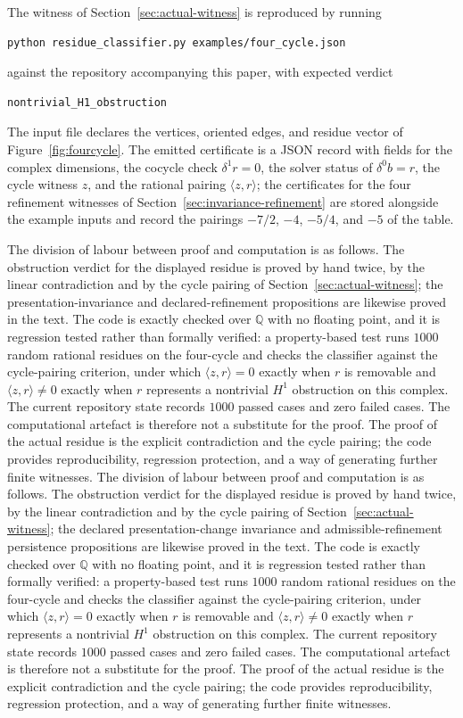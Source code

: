 \documentclass[11pt]{article}
\newcommand{\Q}{\mathbb{Q}}
\begin{document}
The witness of Section~\ref{sec:actual-witness} is reproduced by running
\begin{verbatim}
python residue_classifier.py examples/four_cycle.json
\end{verbatim}
against the repository accompanying this paper, with expected verdict
\begin{verbatim}
nontrivial_H1_obstruction
\end{verbatim}
The input file declares the vertices, oriented edges, and residue vector of Figure~\ref{fig:fourcycle}. The emitted certificate is a JSON record with fields for the complex dimensions, the cocycle check \(\delta^1 r=0\), the solver status of \(\delta^0 b=r\), the cycle witness \(z\), and the rational pairing \(\langle z,r\rangle\); the certificates for the four refinement witnesses of Section~\ref{sec:invariance-refinement} are stored alongside the example inputs and record the pairings \(-7/2\), \(-4\), \(-5/4\), and \(-5\) of the table.

The division of labour between proof and computation is as follows. The obstruction verdict for the displayed residue is proved by hand twice, by the linear contradiction and by the cycle pairing of Section~\ref{sec:actual-witness}; the presentation-invariance and declared-refinement propositions are likewise proved in the text. The code is exactly checked over \(\Q\) with no floating point, and it is regression tested rather than formally verified: a property-based test runs \(1000\) random rational residues on the four-cycle and checks the classifier against the cycle-pairing criterion, under which \(\langle z,r\rangle=0\) exactly when \(r\) is removable and \(\langle z,r\rangle\neq 0\) exactly when \(r\) represents a nontrivial \(H^1\) obstruction on this complex. The current repository state records \(1000\) passed cases and zero failed cases. The computational artefact is therefore not a substitute for the proof. The proof of the actual residue is the explicit contradiction and the cycle pairing; the code provides reproducibility, regression protection, and a way of generating further finite witnesses.
The division of labour between proof and computation is as follows. The obstruction verdict for the displayed residue is proved by hand twice, by the linear contradiction and by the cycle pairing of Section~\ref{sec:actual-witness}; the declared presentation-change invariance and admissible-refinement persistence propositions are likewise proved in the text. The code is exactly checked over \(\Q\) with no floating point, and it is regression tested rather than formally verified: a property-based test runs \(1000\) random rational residues on the four-cycle and checks the classifier against the cycle-pairing criterion, under which \(\langle z,r\rangle=0\) exactly when \(r\) is removable and \(\langle z,r\rangle\neq 0\) exactly when \(r\) represents a nontrivial \(H^1\) obstruction on this complex. The current repository state records \(1000\) passed cases and zero failed cases. The computational artefact is therefore not a substitute for the proof. The proof of the actual residue is the explicit contradiction and the cycle pairing; the code provides reproducibility, regression protection, and a way of generating further finite witnesses.
\end{document}
